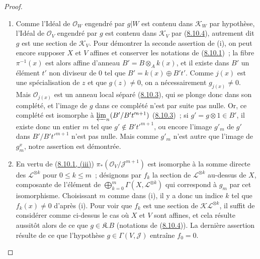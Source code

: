 \begin{proof}
\begin{enumerate}
  \item[\rm{(i)}] Comme l'Idéal de $\mathcal{O}_W$ engendré par $g|W$ est
  contenu dans $\mathcal{K}_W$ par hypothèse, l'Idéal de $\mathcal{O}_V$
  engendré par $g$ est contenu dans $\mathcal{K}_V$ par
  (\hyperref[II.8.10.4-fr]{8.10.4}), autrement dit $g$ est une section de
  $\mathcal{K}_V$. Pour démontrer la seconde assertion de (i), on peut encore
  supposer $X$ et $V$ affines et conserver les notations de
  (\hyperref[II.8.10.1-fr]{8.10.1})~; la fibre $\pi^{-1}(x)$ est alors affine
  d'anneau $B'=B\otimes_A k(x)$, et il existe dans $B'$ un élément $t'$ non
  diviseur de 0 tel que $B'=k(x)\oplus B't'$. Comme $j(x)$ est une
  spécialisation de $z$ et que $g(z)\neq0$, on a nécessairement
  $g_{j(x)}\neq0$. Mais $\mathcal{O}_{j(x)}$ est un anneau local séparé
  (\hyperref[II.8.10.3-fr]{8.10.3}), qui se plonge donc dans son complété, et
  l'image de $g$ dans ce complété n'est par suite pas nulle. Or, ce complété
  est isomorphe à $\varprojlim_n(B'/B't'^{n+1})$
  (\hyperref[II.8.10.3-fr]{8.10.3})~; si $g'=g\otimes1\in B'$, il existe donc
  un entier $m$ tel que $g'\notin B't'^{m+1}$, ou encore l'image $g'_m$ de
  $g'$ dans $B'/B't'^{m+1}$ n'est pas nulle. Mais comme $g'_m$ n'est autre que
  l'image de $g_m^x$, notre assertion est démontrée.
  \item[\rm{(ii)}] En vertu de
  (\hyperref[II.8.10.1-fr]{8.10.1, (iii)})
  $\pi_*(\mathcal{O}_V/\mathcal{J}^{m+1})$ est isomorphe à la somme directe
  des $\mathcal{L}^{\otimes k}$ pour $0\leqslant k\leqslant m$~; désignons
  par $f_k$ la section de $\mathcal{L}^{\otimes k}$ au-dessus de $X$,
  composante de l'élément de
  $\bigoplus_{k=0}^m\Gamma(X,\mathcal{L}^{\otimes k})$ qui correspond à $g_m$
  par cet isomorphisme. Choisissant $m$ comme dans (i), il y a donc un indice
  $k$ tel que $f_k(x)\neq0$ d'après (i). Pour voir que $f_k$ est une section
  de $\mathcal{K}\mathcal{L}^{\otimes k}$, il suffit de considérer comme
  ci-dessus le cas où $X$ et $V$ sont affines, et cela résulte aussitôt alors
  de ce que $g\in\mathfrak{K}.B$ (notations de
  (\hyperref[II.8.10.4-fr]{8.10.4})). La dernière assertion résulte de ce que
  l'hypothèse $g\in\Gamma(V,\mathcal{J})$ entraîne $f_0=0$.
\end{enumerate}
\end{proof}


